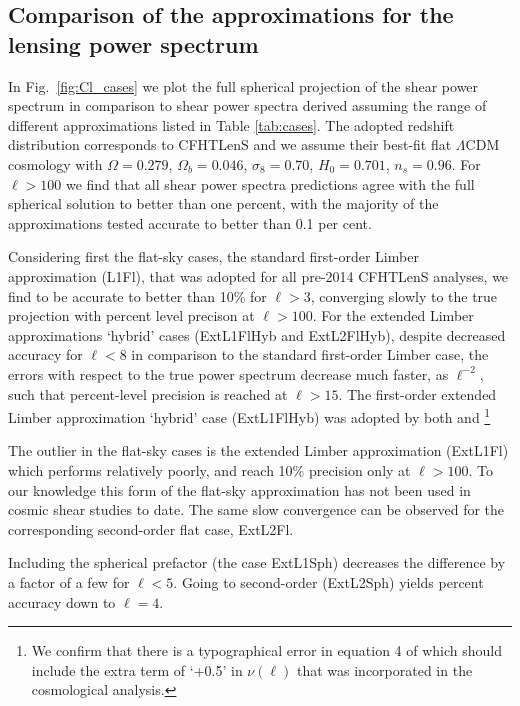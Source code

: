 \documentclass[fleqn,usenatbib]{mnras} %
\begin{document}
\subsection{Comparison of the approximations for the lensing power spectrum}
\label{sec:comp}

In Fig.~\ref{fig:Cl_cases} we plot the full spherical projection of the shear
power spectrum in comparison to shear power spectra derived assuming the range
of different approximations listed in Table \ref{tab:cases}.  The adopted
redshift distribution corresponds to CFHTLenS \cite{CFHTLenS-2pt-notomo} and we
assume their best-fit flat $\Lambda$CDM cosmology with $\Omega=0.279$,
$\Omega_b=0.046$, $\sigma_8=0.70$, $H_0=0.701$, $n_s=0.96$. For $\ell > 100$ we
find that all shear power spectra predictions agree with the full spherical
solution to better than one percent, with the majority of the approximations
tested accurate to better than 0.1 per cent.   

Considering first the flat-sky cases, the standard first-order Limber
approximation (L1Fl), that was adopted for all pre-2014 CFHTLenS analyses, we
find to be accurate to better than 10\% for $\ell>3$, converging slowly to the
true projection with percent level precison at $\ell>100$. For the extended
Limber approximations `hybrid' cases (ExtL1FlHyb and ExtL2FlHyb), despite
decreased accuracy for $\ell < 8$ in comparison to the standard first-order
Limber case, the errors with respect to the true power spectrum decrease much
faster, as $\ell^{-2}$, such that percent-level precision is reached at
$\ell>15$.  The first-order extended Limber approximation `hybrid' case
(ExtL1FlHyb) was adopted by both \citet{joudaki/etal:2016} and
\cite{KiDS-450}\footnote{We confirm that there is a typographical error in
equation 4 of \cite{KiDS-450} which should include the extra term of `+0.5' in
$\nu(\ell)$ that was incorporated in the cosmological analysis.} 

The outlier in the flat-sky cases is the extended Limber approximation
(ExtL1Fl) which performs relatively poorly, and reach 10\% precision only at
$\ell > 100$. To our knowledge this form of the flat-sky approximation has not
been used in cosmic shear studies to date. The same slow convergence can be
observed for the corresponding second-order flat case, ExtL2Fl.

Including the spherical prefactor (the case ExtL1Sph) decreases the difference
by a factor of a few for $\ell < 5$. Going to second-order (ExtL2Sph) yields
percent accuracy down to $\ell = 4$.
\end{document}
